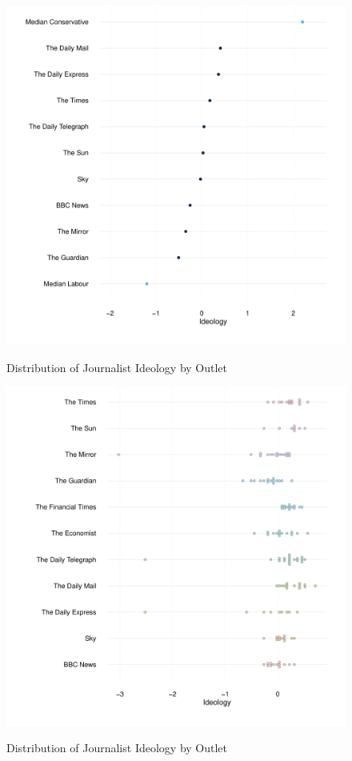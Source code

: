 \documentclass[12pt, letterpaper]{article}
\begin{document}
\begin{figure}[!htbp]
\centering
\caption{Distribution of Journalist Ideology by Outlet}
\includegraphics[scale=1]{../figs/line_plot_aug.pdf}
\label{fig:fig2}
\end{figure}

\begin{figure}[!htbp]
\centering
\caption{Distribution of Journalist Ideology by Outlet}
\includegraphics[scale=1]{../figs/media_dotplot_aug.pdf}
\label{fig:fig3}
\end{figure}
\end{document}

